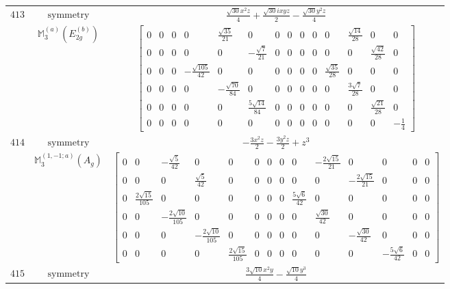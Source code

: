 \documentclass[fleqn,8pt,landscape]{jsarticle}
\begin{document}
\begin{longtable}{ccc}
$ 413 $ & $ \text{symmetry} $ & $ \frac{\sqrt{30} x^{2} z}{4} + \frac{\sqrt{30} i x y z}{2} - \frac{\sqrt{30} y^{2} z}{4} $ \\
$  $ & $ \mathbb{M}_{3}^{(a)}(E_{2g}^{(b)}) $ & $ \begin{bmatrix} 0 & 0 & 0 & 0 & \frac{\sqrt{35}}{21} & 0 & 0 & 0 & 0 & 0 & 0 & \frac{\sqrt{14}}{28} & 0 & 0 \\ 0 & 0 & 0 & 0 & 0 & - \frac{\sqrt{7}}{21} & 0 & 0 & 0 & 0 & 0 & 0 & \frac{\sqrt{42}}{28} & 0 \\ 0 & 0 & 0 & - \frac{\sqrt{105}}{42} & 0 & 0 & 0 & 0 & 0 & 0 & \frac{\sqrt{35}}{28} & 0 & 0 & 0 \\ 0 & 0 & 0 & 0 & - \frac{\sqrt{70}}{84} & 0 & 0 & 0 & 0 & 0 & 0 & \frac{3 \sqrt{7}}{28} & 0 & 0 \\ 0 & 0 & 0 & 0 & 0 & \frac{5 \sqrt{14}}{84} & 0 & 0 & 0 & 0 & 0 & 0 & \frac{\sqrt{21}}{28} & 0 \\ 0 & 0 & 0 & 0 & 0 & 0 & 0 & 0 & 0 & 0 & 0 & 0 & 0 & - \frac{1}{4} \end{bmatrix} $ \\ \hline
$ 414 $ & $ \text{symmetry} $ & $ - \frac{3 x^{2} z}{2} - \frac{3 y^{2} z}{2} + z^{3} $ \\
$  $ & $ \mathbb{M}_{3}^{(1,-1;a)}(A_{g}) $ & $ \begin{bmatrix} 0 & 0 & - \frac{\sqrt{5}}{42} & 0 & 0 & 0 & 0 & 0 & 0 & - \frac{2 \sqrt{15}}{21} & 0 & 0 & 0 & 0 \\ 0 & 0 & 0 & \frac{\sqrt{5}}{42} & 0 & 0 & 0 & 0 & 0 & 0 & - \frac{2 \sqrt{15}}{21} & 0 & 0 & 0 \\ 0 & \frac{2 \sqrt{15}}{105} & 0 & 0 & 0 & 0 & 0 & 0 & \frac{5 \sqrt{6}}{42} & 0 & 0 & 0 & 0 & 0 \\ 0 & 0 & - \frac{2 \sqrt{10}}{105} & 0 & 0 & 0 & 0 & 0 & 0 & \frac{\sqrt{30}}{42} & 0 & 0 & 0 & 0 \\ 0 & 0 & 0 & - \frac{2 \sqrt{10}}{105} & 0 & 0 & 0 & 0 & 0 & 0 & - \frac{\sqrt{30}}{42} & 0 & 0 & 0 \\ 0 & 0 & 0 & 0 & \frac{2 \sqrt{15}}{105} & 0 & 0 & 0 & 0 & 0 & 0 & - \frac{5 \sqrt{6}}{42} & 0 & 0 \end{bmatrix} $ \\ \hline
$ 415 $ & $ \text{symmetry} $ & $ \frac{3 \sqrt{10} x^{2} y}{4} - \frac{\sqrt{10} y^{3}}{4} $ \\

\end{longtable}
\end{document}

